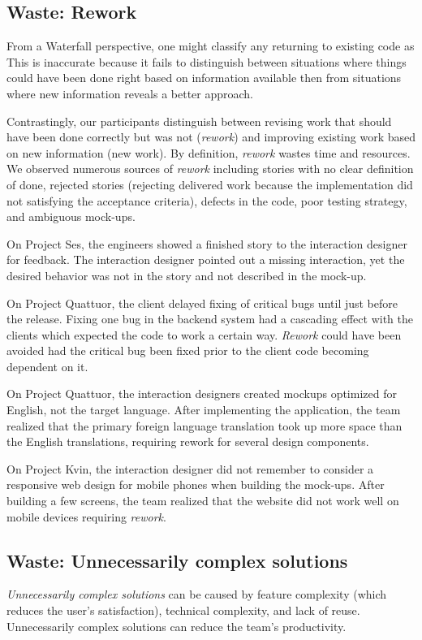 \subsection{Waste: Rework}
From a Waterfall perspective, one might classify any returning to existing code as  This is inaccurate because it fails to distinguish between situations where things could have been done right based on information available then from situations where new information reveals a better approach. 

Contrastingly, our participants distinguish between revising work that should have been done correctly but was not (\textit{rework}) and improving existing work based on new information (new work). By definition, \textit{rework} wastes time and resources. We observed numerous sources of \textit{rework} including stories with no clear definition of done, rejected stories (rejecting delivered work because the implementation did not satisfying the  acceptance criteria), defects in the code, poor testing strategy, and ambiguous mock-ups.

On Project Ses, the engineers showed a finished story to the interaction designer for feedback. The interaction designer pointed out a missing interaction, yet the desired behavior was not in the story and not described in the mock-up.

On Project Quattuor, the client delayed fixing of critical bugs until just before the release. Fixing one bug in the backend system had a cascading effect with the clients which expected the code to work a certain way. \textit{Rework} could have been avoided had the critical bug been fixed prior to the client code becoming dependent on it.

On Project Quattuor, the interaction designers created mockups optimized for English, not the target language. After implementing the application, the team realized that the primary foreign language translation took up more space than the English translations, requiring rework for several design components. 

On Project Kvin, the interaction designer did not remember to consider a responsive web design for mobile phones when building the mock-ups. After building a few screens, the team realized that the website did not work well on mobile devices requiring \textit{rework}.
\subsection{Waste: Unnecessarily complex solutions}
\textit{Unnecessarily complex solutions} can be caused by feature complexity (which reduces the user's satisfaction), technical complexity, and lack of reuse. Unnecessarily complex solutions can reduce the team's productivity. 

